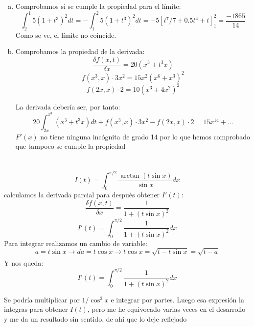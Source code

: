 \documentclass[12pt,a4paper,oneside,onecolumn]{article}
\begin{document}
    \begin{enumerate}[a)]
    \item Comprobamos si se cumple la propiedad para el l\'imite:
    \[
        \int_{2}^{1}{5(1+t^3)^2}dt = -\int_{1}^{2}{5(1+t^3)^2}dt = -5[t^7/7 + 0.5t^4 + t]^2_1 = \frac{-1865}{14}
    \]
    Como se ve, el l\'imite no coincide.
    \newline
    \newline 
    \item Comprobamos la propiedad de la derivada:
    \[
        \frac{\delta f(x, t)}{\delta x} = 20(x^3 + t^3x)
    \]
    \[
        f(x^3, x)\cdot 3x^2 = 15x^2(x^6 +x^3)^2
    \]
    \[
        f(2x, x)\cdot 2 = 10(x^3 + 4x^2)^2 
    \]
    
    La derivada deber\'ia ser, por tanto:
    \[
        20\int_{2x}^{x^3}{(x^3 + t^3x)}dt  + f(x^3, x)\cdot 3x^2 - f(2x, x)\cdot 2 = 15x^14 + ... 
    \]
    $F'(x)$ no tiene ninguna inc\'ognita de grado 14 por lo que hemos comprobado que tampoco se cumple la propiedad
    
    
    \end{enumerate}
    \section{}
    \[
        I(t) =  \int_{0}^{\pi /2}{\frac{\arctan{(t\sin{x})}}{\sin{x}}}dx
    \]
    calculamos la derivada parcial para despuès obtener $I'(t)$:
    \[
        \frac{\delta f(x, t)}{\delta x} = \frac{1}{1 + (t\sin{x})^2}
    \]
    \[
        I'(t) =  \int_{0}^{\pi /2}{\frac{1}{1 + (t\sin{x})^2}}dx
    \]
    Para integrar realizamos un cambio de variable:
    \[
        a = t\sin{x} \xrightarrow[]{} da = t\cos{x} \xrightarrow[]{} t\cos{x} = \sqrt{t - t\sin{x}} = \sqrt{t - a} 
    \]
    Y nos queda:
    \[
        I'(t) =  \int_{0}^{\pi /2}{\frac{1}{1 + (t\sin{x})^2}}dx
    \]
    
    Se podr\'ia multiplicar por $1/\cos^2{x}$ e integrar por partes. Luego esa expresi\'on la integras para obtener $I(t)$, pero me he equivocado varias veces en el desarrollo y me da un resultado sin sentido, de ah\'i que lo deje reflejado
\end{document}
